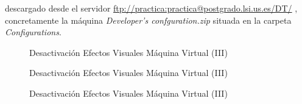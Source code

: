 \documentclass{scrartcl}
\begin{document}
 
descargado desde el servidor \href{ftp://practica:practica@postgrado.lsi.us.es/DT/}{ftp://practica:practica@postgrado.lsi.us.es/DT/} , concretamente la máquina \textit{Developer's confguration.zip}  situada en la carpeta  \textit{Configurations}.
\begin{figure}[H]
	
	\centering
	\caption{Desactivación Efectos Visuales Máquina Virtual (III)}
	\label{fig:ConfEcl01}
	
\end{figure}
\begin{figure}[H]
	
	\centering
	\caption{Desactivación Efectos Visuales Máquina Virtual (III)}
	\label{fig:ConfEcl02}
	
\end{figure}
\begin{figure}[H]
	
	\centering
	\caption{Desactivación Efectos Visuales Máquina Virtual (III)}
	\label{fig:ConfEcl03}
	
\end{figure}
\end{document}
